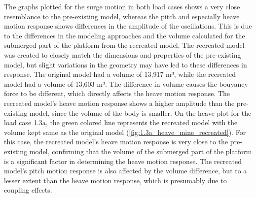 \documentclass[a4paper, 11pt]{article}
\begin{document}
The graphs plotted for the surge motion in both load cases shows a very close resemblance to the pre-existing model, whereas the pitch and especially heave motion response shows differences in the amplitude of the oscillations. This is due to the differences in the modeling approaches and the volume calculated for the submerged part of the platform from the recreated model. The recreated model was created to closely match the dimensions and properties of the pre-existing model, but slight variations in the geometry may have led to these differences in response. The original model had a volume of 13,917 m³, while the recreated model had a volume of 13,603 m³. The difference in volume causes the bouyancy force to be different, which directly affects the heave motion response. The recreated model's heave motion response shows a higher amplitude than the pre-existing model, since the volume of the body is smaller. On the heave plot for the load case 1.3a, the green colored line represents the recreated model with the volume kept same as the original model (\autoref{fig:1.3a_heave_mine_recreated}). For this case, the recreated model's heave motion response is very close to the pre-existing model, confirming that the volume of the submerged part of the platform is a significant factor in determining the heave motion response. The recreated model's pitch motion response is also affected by the volume difference, but to a lesser extent than the heave motion response, which is presumably due to coupling effects.
\end{document}
